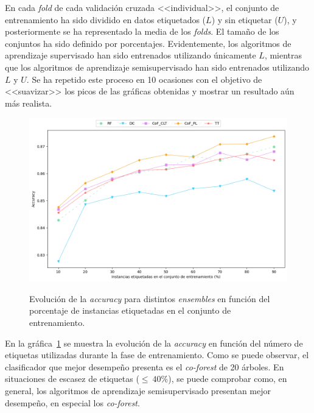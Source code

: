 En cada \textit{fold} de cada validación cruzada <<individual>>, el conjunto de entrenamiento ha sido dividido en datos etiquetados ($L$) y sin etiquetar ($U$), y posteriormente se ha representado la media de los \textit{folds}. El tamaño de los conjuntos ha sido definido por porcentajes. Evidentemente, los algoritmos de aprendizaje supervisado han sido entrenados utilizando únicamente $L$, mientras que los algoritmos de aprendizaje semisupervisado han sido entrenados utilizando $L$ y $U$. Se ha repetido este proceso en 10 ocasiones con el objetivo de <<suavizar>> los picos de las gráficas obtenidas y mostrar un resultado aún más realista.

\begin{figure}[h]
	\caption[\textit{Phishing}: comparativa SL contra SSL (\textit{accuracy})]{Evolución de la \textit{accuracy} para distintos \textit{ensembles} en función del porcentaje de instancias etiquetadas en el conjunto de entrenamiento.}
	\centering
	\includegraphics[scale=0.45]{../img/memoria/5_phishing/f1f19_evolution_acc}
	\label{gr:ph-f1f19_sl-ssl-acc}
\end{figure}

En la gráfica~\ref{gr:ph-f1f19_sl-ssl-acc} se muestra la evolución de la \textit{accuracy} en función del número de etiquetas utilizadas durante la fase de entrenamiento. Como se puede observar, el clasificador que mejor desempeño presenta es el \textit{co-forest} de 20 árboles. En situaciones de escasez de etiquetas ($\le~40\%$), se puede comprobar como, en general, los algoritmos de aprendizaje semisupervisado presentan mejor desempeño, en especial los \textit{co-forest}.


